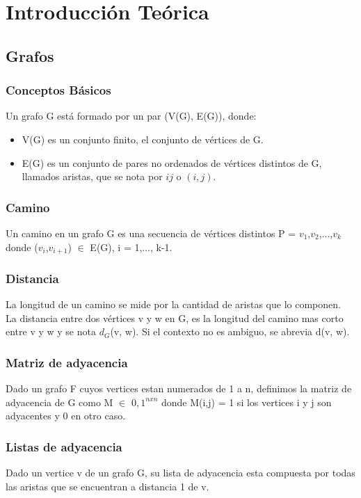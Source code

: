 \section{Introducción Teórica}


\subsection{Grafos}

\subsubsection{Conceptos Básicos}
\indent Un grafo G está formado por un par (V(G), E(G)), donde:
\begin{itemize}
 \item V(G) es un conjunto finito, el conjunto de vértices de G.
 \item E(G) es un conjunto de pares no ordenados de vértices distintos de G, llamados aristas, que se nota por $ij$ o $(i,j)$.
\end{itemize}


\subsubsection{Camino}
\indent Un camino en un grafo G es una secuencia de vértices distintos P = $v_1$,$v_2$,...,$v_k$ donde ($v_i$,$v_{i+1}$) $\in$ E(G), i = 1,..., k-1. 


\subsubsection{Distancia}
\indent La longitud de un camino se mide por la cantidad de aristas que lo componen.\\
\indent La distancia entre dos vértices v y w en G, es la longitud del camino mas corto entre v y w y se nota $d_G$(v, w). Si el contexto no es ambiguo, se abrevia d(v, w).

\subsubsection{Matriz de adyacencia}
\indent Dado un grafo F cuyos vertices estan numerados de 1 a n, definimos la matriz de adyacencia de G como M $\in$ ${0,1}^{nxn}$ donde M(i,j) = 1 si los vertices i y j son adyacentes y 0 en otro caso.

\subsubsection{Listas de adyacencia}
\indent Dado un vertice v de un grafo G, su lista de adyacencia esta compuesta por todas las aristas que se encuentran a distancia 1 de v.

